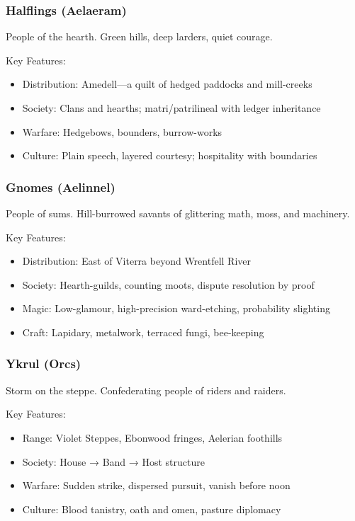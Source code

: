 \subsubsection{Halflings (Aelaeram)}
\label{sec:halflings}

People of the hearth. Green hills, deep larders, quiet courage.

Key Features:
\begin{itemize}
    \item Distribution: Amedell—a quilt of hedged paddocks and mill-creeks
    \item Society: Clans and hearths; matri/patrilineal with ledger inheritance
    \item Warfare: Hedgebows, bounders, burrow-works
    \item Culture: Plain speech, layered courtesy; hospitality with boundaries
\end{itemize}

\subsubsection{Gnomes (Aelinnel)}
\label{sec:gnomes}

People of sums. Hill-burrowed savants of glittering math, moss, and machinery.

Key Features:
\begin{itemize}
    \item Distribution: East of Viterra beyond Wrentfell River
    \item Society: Hearth-guilds, counting moots, dispute resolution by proof
    \item Magic: Low-glamour, high-precision ward-etching, probability slighting
    \item Craft: Lapidary, metalwork, terraced fungi, bee-keeping
\end{itemize}

\subsubsection{Ykrul (Orcs)}
\label{sec:ykrulpeoples}

Storm on the steppe. Confederating people of riders and raiders.

Key Features:
\begin{itemize}
    \item Range: Violet Steppes, Ebonwood fringes, Aelerian foothills
    \item Society: House → Band → Host structure
    \item Warfare: Sudden strike, dispersed pursuit, vanish before noon
    \item Culture: Blood tanistry, oath and omen, pasture diplomacy
\end{itemize}

